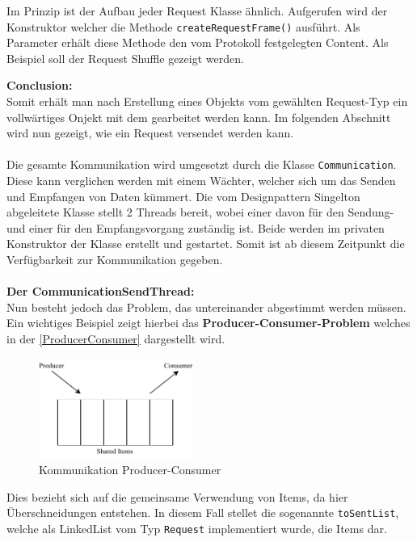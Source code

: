 Im Prinzip ist der Aufbau jeder Request Klasse ähnlich.
Aufgerufen wird der Konstruktor welcher die Methode \lstinline[style=java]{createRequestFrame()} ausführt.
Als Parameter erhält diese Methode den vom Protokoll festgelegten Content.
Als Beispiel soll der Request Shuffle gezeigt werden.

\textbf{Conclusion:}\\
Somit erhält man nach Erstellung eines Objekts vom gewählten Request-Typ ein vollwärtiges Onjekt mit dem gearbeitet werden kann.
Im folgenden Abschnitt wird nun gezeigt, wie ein Request versendet werden kann.\\\\
Die gesamte Kommunikation wird umgesetzt durch die Klasse \lstinline[style=java]{Communication}.
Diese kann verglichen werden mit einem Wächter, welcher sich um das Senden und Empfangen von Daten kümmert.
Die vom Designpattern Singelton abgeleitete Klasse stellt 2 Threads bereit, wobei einer davon für den Sendung- und einer für den Empfangsvorgang zuständig ist.
Beide werden im privaten Konstruktor der Klasse erstellt und gestartet.
Somit ist ab diesem Zeitpunkt die Verfügbarkeit zur Kommunikation gegeben.\\\\
\textbf{Der CommunicationSendThread:}\\
Nun besteht jedoch das Problem, das  untereinander abgestimmt werden müssen.
Ein wichtiges Beispiel zeigt hierbei das \textbf{Producer-Consumer-Problem} welches in der \autoref{ProducerConsumer} dargestellt wird.
\begin{figure}[H]
\centering
\includegraphics[width=0.45\textwidth]{fig/ainf/ProducerConsumer.pdf}
\caption{Kommunikation Producer-Consumer}
\label{ProducerConsumer}
\end{figure}
Dies bezieht sich auf die gemeinsame Verwendung von Items, da hier Überschneidungen entstehen.
In diesem Fall stellet die sogenannte \lstinline[style=java]{toSentList}, welche als LinkedList vom Typ \lstinline[style=java]{Request} implementiert wurde, die Items dar.
